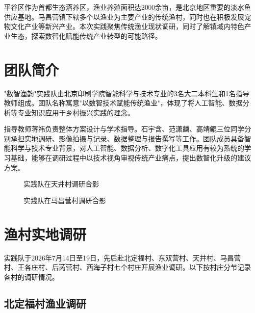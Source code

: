 \documentclass[12pt,a4paper]{article}
\begin{document}
平谷区作为首都生态涵养区，渔业养殖面积达2000余亩，是北京地区重要的淡水鱼供应基地。马昌营镇下辖多个以渔业为主要产业的传统渔村，同时也在积极发展宠物文化产业等新兴产业。本次实践聚焦传统渔业现状调研，同时了解镇域内特色产业生态，探索数智化赋能传统产业转型的可能路径。

\section{团队简介}

"数智渔韵"实践队由北京印刷学院智能科学与技术专业的3名大二本科生和1名指导教师组成。团队名称寓意"以数智技术赋能传统渔业"，体现了将人工智能、数据分析等专业知识应用于乡村振兴实践的理念。

指导教师蒋祎负责整体方案设计与学术指导。石宇含、范潇麟、高靖鲲三位同学分别承担实地调研、影像拍摄与记录、数据整理与报告撰写等工作。团队成员具备智能科学与技术专业背景，对人工智能、数据分析、数字化工具应用有较为系统的学习基础，能够在调研过程中以技术视角审视传统产业痛点，提出数智化升级的建议方案。

\begin{figure}[H]
\centering
{}
\caption{实践队在天井村调研合影}
\end{figure}

\begin{figure}[H]
\centering
{}
\caption{实践队在马昌营村调研合影}
\end{figure}

\section{渔村实地调研}

实践队于2026年7月14日至19日，先后赴北定福村、东双营村、天井村、马昌营村、王各庄村、后芮营村、西海子村七个村庄开展渔业调研。以下按村庄分节记录各村的调研情况。

\subsection{北定福村渔业调研}
\end{document}

